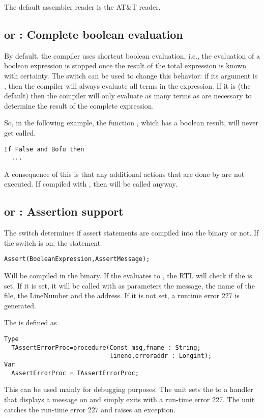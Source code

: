 The default assembler reader is the AT\&T reader.

\subsection{ or  : Complete boolean evaluation}

By default, the compiler uses shortcut boolean evaluation, i.e., the evaluation
of a boolean expression is stopped once the result of the total
expression is known with certainty. The  switch can be used
to change this behavior: if its argument is \var{+}, then the
compiler will always evaluate all terms in the expression. If it is
\var{-} (the default) then the compiler will only evaluate as many
terms as are necessary to determine the result of the complete expression.

So, in the following example, the function , which has a boolean
result, will never get called.
\begin{verbatim}
If False and Bofu then
  ...
\end{verbatim}
A consequence of this is that any additional actions that are done by
 are not executed. If compiled with , then
 will be called anyway.

\subsection{ or  : Assertion support}

The  switch determines if assert statements are
compiled into the binary or not. If the switch is on, the statement
\begin{verbatim}
Assert(BooleanExpression,AssertMessage);
\end{verbatim}
Will be compiled in the binary. If the  evaluates to
, the RTL will check if the  is set. If it
is set, it will be called with as parameters the 
message, the name of the file, the LineNumber and the address. If it is not
set, a runtime error 227 is generated.

The  is defined as
\begin{verbatim}
Type
  TAssertErrorProc=procedure(Const msg,fname : String;
                             lineno,erroraddr : Longint);
Var
  AssertErrorProc = TAssertErrorProc;
\end{verbatim}
This can be used mainly for debugging purposes. The  unit sets the
 to a handler that displays a message on 
and simply exits with a run-time error 227. The  unit catches the run-time error 227
and raises an  exception.

